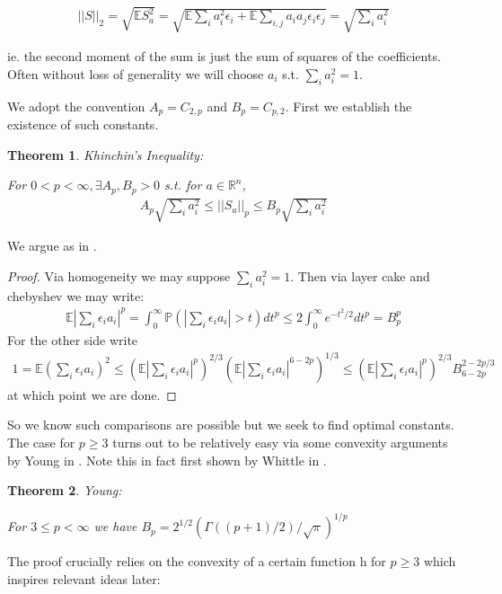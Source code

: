\documentclass[10pt]{article}
\newcommand{\Pp}{\mathbb{P}}
\newcommand{\E}{\mathbb{E}}
\newcommand{\1}{\textbf{1}}
\newcommand{\R}{\mathbb{R}}
\newcommand{\norm}[1]{||#1||}
\newtheorem{theorem}{Theorem}
\theoremstyle{remark}
\theoremstyle{definition}
\begin{document}
\begin{align*}
	\norm{S}_2 = \sqrt{\E S_a^2} = \sqrt{\E\sum_i a_i^2 \epsilon_i + \E\sum_{i,j}a_ia_j \epsilon_i\epsilon_j} = \sqrt{\sum_i a_i^2}
\end{align*}

ie. the second moment of the sum is just the sum of squares of the coefficients. Often without loss of generality we will choose $a_i$ s.t. $\sum_i a_i^2 = 1$.  

We adopt the convention $A_p = C_{2,p}$ and $B_p = C_{p,2}$. First we establish the existence of such constants. 

\begin{theorem}Khinchin's Inequality:
	
	For $0 < p < \infty, \exists A_p,B_p > 0$ s.t. for $a \in \R^n$,
	\begin{align*}
		A_p\sqrt{\sum_i a_i^2} \leq \norm{S_a}_p \leq B_p \sqrt{\sum_i a_i^2}
	\end{align*}
\end{theorem}

We argue as in \cite{LT}.

\begin{proof}
	Via homogeneity we may suppose $\sum_i a_i^2 = 1$. Then via layer cake and chebyshev we may write:
	\begin{align*}
		\E |\sum_i \epsilon_i a_i|^p = \int_0^{\infty} \Pp(|\sum_i \epsilon_i a_i | > t) dt^p \leq 2 \int_0^{\infty} e^{-t^2/2}dt^p = B_p^p
	\end{align*}
	For the other side write
	\begin{align*}
		1 = \E(\sum_i \epsilon_i a_i)^2 \leq (\E |\sum_i \epsilon_i a_i|^p)^{2/3}(\E |\sum_i \epsilon_i a_i|^{6-2p})^{1/3} \leq (\E|\sum_i \epsilon_i a_i|^p)^{2/3} B_{6-2p}^{2-2p/3}
	\end{align*}
	at which point we are done.
\end{proof}


So we know such comparisons are possible but we seek to find optimal constants. The case for $p \geq 3$ turns out to be relatively easy via some convexity arguments by Young in \cite{Y}. Note this in fact first shown by Whittle in \cite{W}.

\begin{theorem}Young:

For $3 \leq p < \infty$ we have $B_p = 2^{1/2}(\Gamma((p+1)/2)/\sqrt{\pi})^{1/p}$	
\end{theorem}

The proof crucially relies on the convexity of a certain function h for $p \geq 3$ which inspires relevant ideas later:
\end{document}
